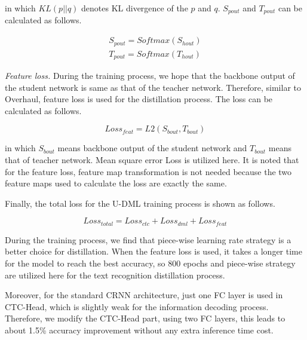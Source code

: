 \documentclass[letterpaper]{article} %
\begin{document}
in which $KL(p || q)$ denotes KL divergence of the $p$ and $q$. $S_{pout}$ and $T_{pout}$ can be calculated as follows.

\begin{small}
\begin{equation}
\begin{aligned}
S_{pout} = Softmax(S_{hout}) \\
T_{pout} = Softmax(T_{hout})
\end{aligned}
\end{equation}
\label{pout_calc}
\end{small}

\textit{Feature loss.}
During the training process, we hope that the backbone output of the student network is same as that of the teacher network. Therefore, similar to Overhaul, feature loss is used for the distillation process. The loss can be calculated as follows.

\begin{small}
\begin{equation}
Loss_{feat} = L2(S_{bout}, T_{bout})
\end{equation}
\label{loss_feat}
\end{small}

in which $S_{bout}$ means backbone output of the student network and $T_{bout}$ means that of teacher network. Mean square error Loss is utilized here. It is noted that for the feature loss,  feature map transformation is not needed because the two feature maps used to calculate the loss are exactly the same.

Finally, the total loss for the U-DML training process is shown as follows.


\begin{small}
\begin{equation}
Loss_{total} = Loss_{ctc} + Loss_{dml} + Loss_{feat}
\end{equation}
\label{loss_udml_total}
\end{small}

During the training process, we find that piece-wise learning rate strategy is a better choice for distillation. When the feature loss is used, it takes a longer time for the model to reach the best accuracy, so 800 epochs and piece-wise strategy are utilized here for the text recognition distillation process.

Moreover, for the standard CRNN architecture, just one FC layer is used in CTC-Head, which is slightly weak for the information decoding process. Therefore, we modify the CTC-Head part, using two FC layers, this leads to about 1.5\% accuracy improvement without any extra inference time cost.
\end{document}
